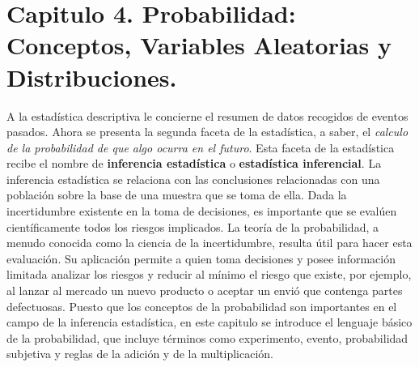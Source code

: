 \documentclass[]{article}
\begin{document}
\section{Capitulo 4. Probabilidad: Conceptos, Variables Aleatorias y Distribuciones.}
A la estadística descriptiva le concierne el resumen de datos recogidos de eventos pasados. Ahora se presenta la segunda faceta de la estadística, a saber, el \textit{calculo de la probabilidad de que algo ocurra en el futuro}. Esta faceta de la estadística recibe el nombre de \textbf{inferencia estadística} o \textbf{estadística inferencial}. La inferencia estadística se relaciona con las conclusiones relacionadas con una población sobre la base de una muestra que se toma de ella. Dada la incertidumbre existente en la toma de decisiones, es importante que se evalúen científicamente todos los riesgos implicados. La teoría de la probabilidad, a menudo conocida como la ciencia de la incertidumbre, resulta útil para hacer esta evaluación. Su aplicación permite a quien toma decisiones y posee información limitada analizar los riesgos y reducir al mínimo el riesgo que existe, por ejemplo, al lanzar al mercado un nuevo producto o aceptar un envió que contenga partes defectuosas. Puesto que los conceptos de la probabilidad son importantes en el campo de la inferencia estadística, en este capitulo se introduce el lenguaje básico de la probabilidad, que incluye términos como experimento, evento, probabilidad subjetiva y reglas de la adición y de la multiplicación.
\end{document}
